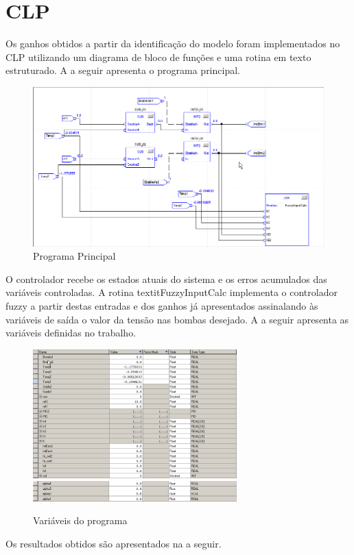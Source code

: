 \section{CLP}
Os ganhos obtidos a partir da identificação do modelo foram implementados no CLP utilizando um diagrama de bloco de funções e uma rotina em texto estruturado. A  a seguir apresenta o programa principal. 

\begin{figure}[H]
	\centering
	\includegraphics[width=\textwidth]{img/clp_bf2.png}
	\caption{Programa Principal}
	\label{figCLPCLPbf}
\end{figure}

O controlador recebe os estados atuais do sistema e os erros acumulados das variáveis controladas. A rotina textit{FuzzyInputCalc} implementa o controlador fuzzy a partir destas entradas e dos ganhos já apresentados assinalando às variáveis de saída o valor da tensão nas bombas desejado. A  a seguir apresenta as variáveis definidas no trabalho.

\begin{figure}[H]
	\centering
	\includegraphics[width=0.7\textwidth]{img/tags1.png}\\
	\includegraphics[width=0.7\textwidth]{img/tags2.png}
	\caption{Variáveis do programa}
	\label{figCLPTags1}
\end{figure}

Os resultados obtidos são apresentados na  a seguir.

%

